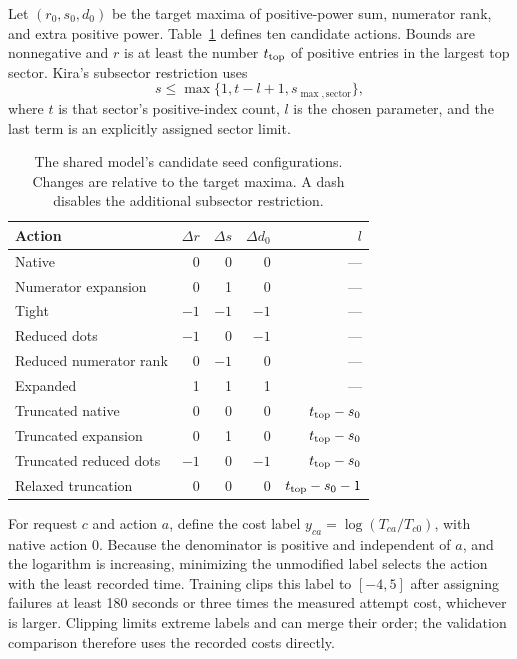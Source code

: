 Let $(r_0,s_0,d_0)$ be the target maxima of positive-power sum, numerator rank, and extra positive power. Table~\ref{tab:shared-actions} defines ten candidate actions. Bounds are nonnegative and $r$ is at least the number $t_{\rm top}$ of positive entries in the largest top sector. Kira's subsector restriction uses~\cite{Kira3}
\begin{equation}
 s\leq\max\{1,t-l+1,s_{\max,\mathrm{sector}}\},
 \label{eq:truncation-new}
\end{equation}
where $t$ is that sector's positive-index count, $l$ is the chosen parameter, and the last term is an explicitly assigned sector limit.
\begin{table}[!htbp]\centering\small
\caption{The shared model's candidate seed configurations. Changes are relative to the target maxima. A dash disables the additional subsector restriction.}
\label{tab:shared-actions}
\begin{tabular}{@{}lrrrr@{}}\toprule
Action & $\Delta r$ & $\Delta s$ & $\Delta d_0$ & $l$\\\midrule
Native &0&0&0&---\\
Numerator expansion &0&1&0&---\\
Tight & $-1$&$-1$&$-1$&---\\
Reduced dots &$-1$&0&$-1$&---\\
Reduced numerator rank &0&$-1$&0&---\\
Expanded &1&1&1&---\\
Truncated native &0&0&0&$t_{\rm top}-s_0$\\
Truncated expansion &0&1&0&$t_{\rm top}-s_0$\\
Truncated reduced dots &$-1$&0&$-1$&$t_{\rm top}-s_0$\\
Relaxed truncation &0&0&0&$t_{\rm top}-s_0-1$\\\bottomrule
\end{tabular}
\end{table}

For request $c$ and action $a$, define the cost label $y_{ca}=\log(T_{ca}/T_{c0})$, with native action $0$. Because the denominator is positive and independent of $a$, and the logarithm is increasing, minimizing the unmodified label selects the action with the least recorded time. Training clips this label to $[-4,5]$ after assigning failures at least 180 seconds or three times the measured attempt cost, whichever is larger. Clipping limits extreme labels and can merge their order; the validation comparison therefore uses the recorded costs directly.


